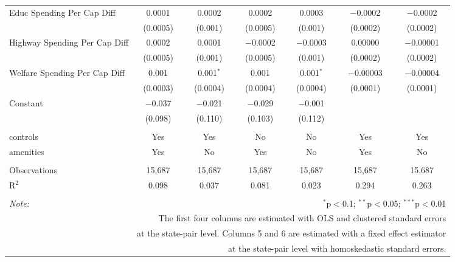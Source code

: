 \begin{table}[!htbp]
\begin{tabular}{@{\extracolsep{5pt}}lcccccc}
  Educ Spending Per Cap Diff & 0.0001 & 0.0002 & 0.0002 & 0.0003 & $-$0.0002 & $-$0.0002 \\ 
  & (0.0005) & (0.001) & (0.0005) & (0.001) & (0.0002) & (0.0002) \\ 
  Highway Spending Per Cap Diff & 0.0002 & 0.0001 & $-$0.0002 & $-$0.0003 & 0.00000 & $-$0.00001 \\ 
  & (0.0005) & (0.001) & (0.0005) & (0.001) & (0.0002) & (0.0002) \\ 
  Welfare Spending Per Cap Diff & 0.001 & 0.001$^{*}$ & 0.001 & 0.001$^{*}$ & $-$0.00003 & $-$0.00004 \\ 
  & (0.0003) & (0.0004) & (0.0004) & (0.0004) & (0.0001) & (0.0001) \\ 
  Constant & $-$0.037 & $-$0.021 & $-$0.029 & $-$0.001 &  &  \\ 
  & (0.098) & (0.110) & (0.103) & (0.112) &  &  \\ 
 \hline \\[-1.8ex] 
controls & Yes & Yes & No & No & Yes & Yes \\ 
amenities & Yes & No & Yes & No & Yes & No \\ 
\hline \\[-1.8ex] 
Observations & 15,687 & 15,687 & 15,687 & 15,687 & 15,687 & 15,687 \\ 
R$^{2}$ & 0.098 & 0.037 & 0.081 & 0.023 & 0.294 & 0.263 \\ 
\hline 
\hline \\[-1.8ex] 
\textit{Note:}  & \multicolumn{6}{r}{$^{*}$p$<$0.1; $^{**}$p$<$0.05; $^{***}$p$<$0.01} \\ 
 & \multicolumn{6}{r}{The first four columns are estimated with OLS and clustered standard errors} \\ 
 & \multicolumn{6}{r}{at the state-pair level. Columns 5 and 6 are estimated with a fixed effect estimator} \\ 
 & \multicolumn{6}{r}{at the state-pair level with homoskedastic standard errors.} \\ 
\end{tabular} 
\end{table} 
